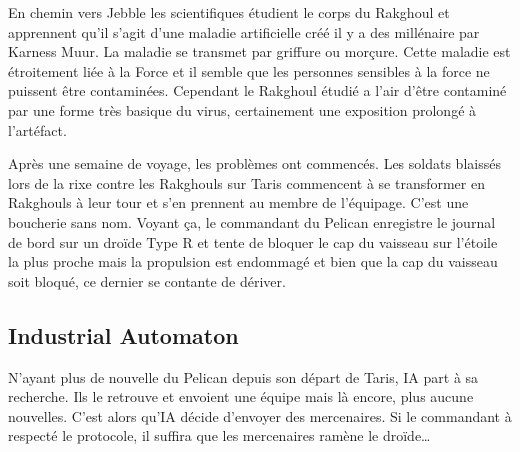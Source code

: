 En chemin vers Jebble les scientifiques étudient le corps du Rakghoul et apprennent qu’il s’agit d’une maladie artificielle créé il y a des millénaire par Karness Muur. La maladie se transmet par griffure ou morçure. Cette maladie est étroitement liée à la Force et il semble que les personnes sensibles à la force ne puissent être contaminées. Cependant le Rakghoul étudié a l’air d’être contaminé par une forme très basique du virus, certainement une exposition prolongé à l’artéfact.

Après une semaine de voyage, les problèmes ont commencés. Les soldats blaissés lors de la rixe contre les Rakghouls sur Taris commencent à se transformer en Rakghouls à leur tour et s’en prennent au membre de l’équipage. C’est une boucherie sans nom. Voyant ça, le commandant du Pelican enregistre le journal de bord sur un droïde Type R et tente de bloquer le cap du vaisseau sur l’étoile la plus proche mais la propulsion est endommagé et bien que la cap du vaisseau soit bloqué, ce dernier se contante de dériver.

\subsection{Industrial Automaton}
N’ayant plus de nouvelle du Pelican depuis son départ de Taris, IA part à sa recherche. Ils le retrouve et envoient une équipe mais là encore, plus aucune nouvelles. C’est alors qu’IA décide d’envoyer des mercenaires. Si le commandant à respecté le protocole, il suffira que les mercenaires ramène le droïde\ldots


